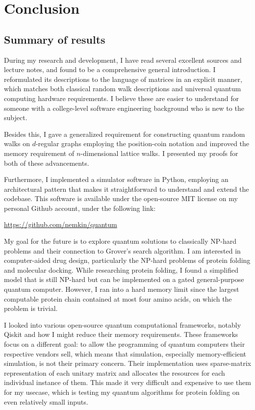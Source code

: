 \chapter{Conclusion}

\section{Summary of results}

During my research and development, I have read several excellent sources \cite{Aharonov, KempeIntroduction, Portugal, Santha, XiaReview} and lecture notes, and found \cite{Portugal} to be a comprehensive general introduction. I reformulated its descriptions to the language of matrices in an explicit manner, which matches both classical random walk descriptions and universal quantum computing hardware requirements. I believe these are easier to understand for someone with a college-level software engineering background who is new to the subject.

Besides this, I gave a generalized requirement for constructing quantum random walks on $d$-regular graphs employing the position-coin notation and improved the memory requirement of $n$-dimensional lattice walks. I presented my proofs for both of these advancements.

Furthermore, I implemented a simulator software in Python, employing an architectural pattern that makes it straightforward to understand and extend the codebase. This software is available under the open-source MIT license on my personal Github account, under the following link:

\url{https://github.com/nemkin/quantum}

My goal for the future is to explore quantum solutions to classically NP-hard problems and their connection to Grover's search algorithm. I am interested in computer-aided drug design, particularly the NP-hard problems of protein folding and molecular docking. While researching protein folding, I found a simplified model that is still NP-hard but can be implemented on a gated general-purpose quantum computer. However, I ran into a hard memory limit since the largest computable protein chain contained at most four amino acids, on which the problem is trivial.

I looked into various open-source quantum computational frameworks, notably Qiskit and how I might reduce their memory requirements. These frameworks focus on a different goal: to allow the programming of quantum computers their respective vendors sell, which means that simulation, especially memory-efficient simulation, is not their primary concern. Their implementation uses sparse-matrix representation of each unitary matrix and allocates the resources for each individual instance of them. This made it very difficult and expensive to use them for my usecase, which is testing my quantum algorithms for protein folding on even relatively small inputs.

